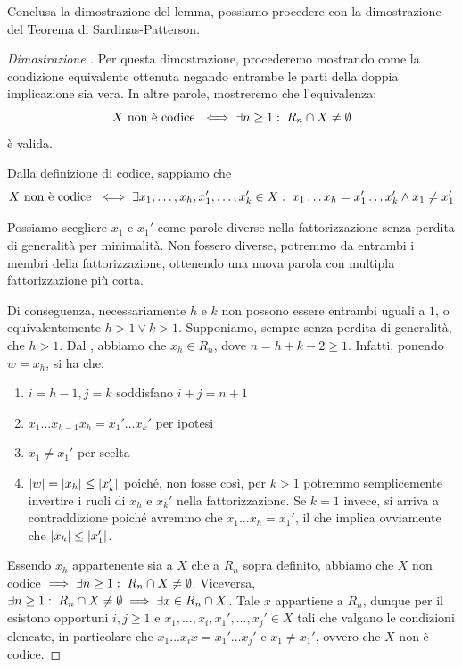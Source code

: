 Conclusa la dimostrazione del lemma, possiamo procedere con la dimostrazione del Teorema di Sardinas-Patterson.
\begin{proof}[Dimostrazione ]
  Per questa dimostrazione, procederemo mostrando come la condizione equivalente ottenuta negando entrambe le parti della doppia implicazione sia vera.
  In altre parole, mostreremo che l'equivalenza:
  \[X \text{ non è codice } \iff \exists n \geq 1 :\; R_n \cap X \neq \emptyset\]
  è valida.

  Dalla definizione di codice, sappiamo che 
  \[X \text{ non è codice } \iff \exists x_1, \ldots, x_h,x_1',\ldots,x_k' \in X :\; x_1\ldots x_h = x_1'\ldots x_k' \land x_1 \neq x_1'\]
  
  Possiamo scegliere \(x_1\) e \(x_1'\) come parole diverse nella fattorizzazione senza perdita di generalità per minimalità.
  Non fossero diverse, potremmo  da entrambi i membri della fattorizzazione, ottenendo una nuova parola con multipla fattorizzazione più corta.
  
  Di conseguenza, necessariamente \(h\) e \(k\) non possono essere entrambi uguali a \(1\), o equivalentemente \(h>1 \lor k>1\).
  Supponiamo, sempre senza perdita di generalità, che \(h>1\).
  Dal , abbiamo che \(x_h \in R_n\), dove \(n = h + k - 2 \geq 1\).
  Infatti, ponendo \(w = x_h\), si ha che:
  \begin{enumerate}
    \item \(i = h - 1, j = k\) soddisfano \(i + j = n + 1\)
    \item \(x_1\ldots x_{h-1} x_h = x_1'\ldots x_k'\) per ipotesi
    \item \(x_1 \neq x_1'\) per scelta
    \item \(\left|w\right| = \left|x_h\right| \leq \left|x_k'\right|\) poiché, non fosse così, per \(k>1\) potremmo semplicemente invertire i ruoli di \(x_h\) e \(x_k'\) nella fattorizzazione.
          Se \(k=1\) invece, si arriva a contraddizione poiché avremmo che \(x_1\ldots x_h = x_1'\), il che implica ovviamente che \(\left|x_h\right| \leq \left|x_1'\right|\).
  \end{enumerate}
  Essendo \(x_h\) appartenente sia a \(X\) che a \(R_n\) sopra definito, abbiamo che \(X\) non codice \(\implies \exists n \geq 1 :\; R_n \cap X \neq \emptyset\).
  Viceversa, \(\exists n \geq 1 :\; R_n \cap X \neq \emptyset \implies \exists x \in R_n \cap X\).
  Tale \(x\) appartiene a \(R_n\), dunque per il  esistono opportuni \(i,j \geq 1\) e \(x_1,\ldots,x_i,x_1',\ldots,x_j' \in X\) tali che valgano le condizioni elencate, in particolare che \(x_1\ldots x_i x = x_1'\ldots x_j'\) e \(x_1 \neq x_1'\), ovvero che \(X\) non è codice.
\end{proof}

